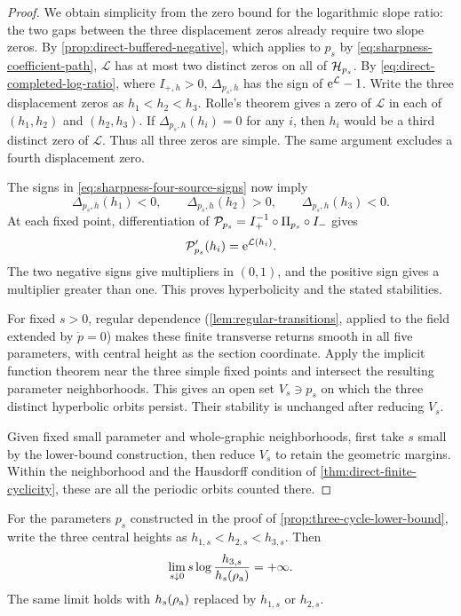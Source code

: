 \begin{proof}
We obtain simplicity from the zero bound for the logarithmic slope
ratio: the two gaps between the three displacement zeros already
require two slope zeros. By \cref{prop:direct-buffered-negative},
which applies to \(p_s\) by \eqref{eq:sharpness-coefficient-path},
\(\mathcal L\) has at most two distinct zeros on all of \(\mathcal H_{p_s}\).
By \eqref{eq:direct-completed-log-ratio}, where \(I_{+,h}>0\),
\(\Delta_{p_s,h}\) has the sign of \(\mathrm e^{\mathcal L}-1\).
Write the three displacement zeros as \(h_1<h_2<h_3\).
Rolle's theorem gives a zero of \(\mathcal L\) in each of
\((h_1,h_2)\) and \((h_2,h_3)\). If
\(\Delta_{p_s,h}(h_i)=0\) for any \(i\), then \(h_i\) would be a
third distinct zero of \(\mathcal L\). Thus all three zeros are
simple. The same argument excludes a fourth displacement zero.

The signs in \eqref{eq:sharpness-four-source-signs} now imply
\[
 \Delta_{p_s,h}(h_1)<0,\qquad
 \Delta_{p_s,h}(h_2)>0,\qquad
 \Delta_{p_s,h}(h_3)<0.
\]
At each fixed point, differentiation of
\(\mathcal P_{p_s}=I_+^{-1}\circ\Pi_{p_s}\circ I_-\) gives
\begin{equation}
\label{eq:sharpness-return-multipliers}
 \mathcal P_{p_s}'(h_i)=\mathrm e^{\mathcal L(h_i)}.
\end{equation}
The two negative signs give multipliers in \((0,1)\), and the
positive sign gives a multiplier greater than one. This proves
hyperbolicity and the stated stabilities.

For fixed \(s>0\), regular dependence
(\cref{lem:regular-transitions}, applied to the field extended by
\(\dot p=0\)) makes these finite transverse returns smooth in all
five parameters, with central height as the section coordinate.
Apply the implicit function theorem near the three simple fixed
points and intersect the resulting parameter neighborhoods.
This gives an open set \(V_s\ni p_s\) on which the three distinct
hyperbolic orbits persist. Their stability is unchanged after
reducing \(V_s\).

Given fixed small parameter and whole-graphic neighborhoods,
first take \(s\) small by the lower-bound construction, then
reduce \(V_s\) to retain the geometric margins.
Within the neighborhood and the Hausdorff condition
of \cref{thm:direct-finite-cyclicity}, these are all the
periodic orbits counted there.
\end{proof}

\begin{corollary}
\label{cor:third-height-separation}
For the parameters \(p_s\) constructed in the proof of
\cref{prop:three-cycle-lower-bound}, write the three central
heights as \(h_{1,s}<h_{2,s}<h_{3,s}\). Then
\begin{equation}
\label{eq:third-height-separation}
 \lim_{s\downarrow0}s\log\frac{h_{3,s}}{h_s(\rho_{\rm a})}=+\infty.
\end{equation}
The same limit holds with \(h_s(\rho_{\rm a})\) replaced by
\(h_{1,s}\) or \(h_{2,s}\).
\end{corollary}

